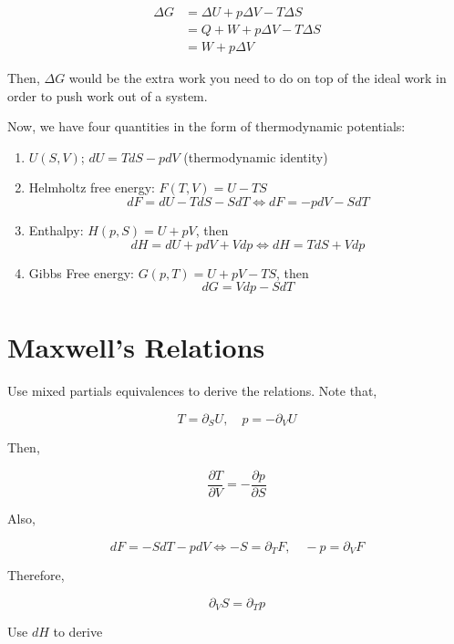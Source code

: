 \documentclass{article}
\newtheorem{one minute paper}[theorem]{One Minute Paper}
\begin{document}
\begin{align}
    \Delta G &= \Delta U + p \Delta V - T \Delta S \\
    &= Q + W + p \Delta V - T \Delta S \\
    &= W + p \Delta V
\end{align}

Then, $\Delta G$ would be the extra work you need to do on top of the ideal work in order to push work out of a system. 

Now, we have four quantities in the form of thermodynamic potentials:

\begin{enumerate}
    \item $U(S,V)$; $dU = TdS - pdV$ (thermodynamic identity)
    \item Helmholtz free energy: $F(T,V) = U - TS$
    $$dF = dU - TdS - S dT \iff dF = -pdV - S dT$$
    \item Enthalpy: $H(p,S) = U + pV$, then
    $$dH = dU + pdV + Vdp \iff dH = T dS + Vdp$$
    \item Gibbs Free energy: $G(p, T) = U + pV - TS$, then 
    $$dG = Vdp - S dT$$
\end{enumerate}

\section*{Maxwell's Relations}

Use mixed partials equivalences to derive the relations. Note that, 

\begin{equation}
    T = \partial_S U, \quad p = -\partial_{V} U
\end{equation}

Then, 

\begin{equation}
    \frac{\partial T}{\partial V} = -\frac{\partial p}{\partial S}
\end{equation}

Also, 

\begin{equation}
    dF = -S dT - pdV \iff -S = \partial_T F, \quad -p = \partial_V F
\end{equation}
 
Therefore, 

\begin{equation}
    \partial_{V}S  = \partial_{T}p
\end{equation}

Use $dH$ to derive 
\end{document}
